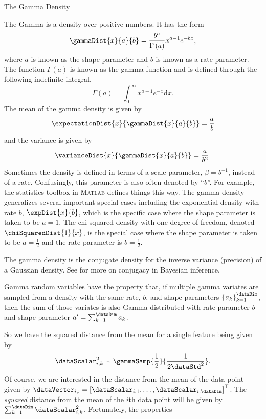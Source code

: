 \begin{boxfloat}
  \caption{The Gamma Density}\label{box:gamma}

  The Gamma is a density over positive numbers. It has the
  form
  \[ 
  \gammaDist{x}{a}{b}=\frac{b^{a}}{\Gamma\left(a\right)}x^{a-1}e^{-bx},
  \] 
  where $a$ is known as the shape parameter and $b$ is known as a rate
  parameter. The function $\Gamma\left(a\right)$ is known as the gamma
  function and is defined through the following indefinite integral,
  \[
  \Gamma\left(a\right)=\int_{0}^{\infty}x^{a-1}e^{-x}\text{d}x.
  \]
  The mean of the gamma density is given by
  \[ 
  \expectationDist{x}{\gammaDist{x}{a}{b}}=\frac{a}{b}
  \] 
  and the variance is given by
  \[
  \varianceDist{x}{\gammaDist{x}{a}{b}}=\frac{a}{b^{2}}.
  \] 
  Sometimes the density is defined in terms of a scale parameter,
  $\beta=b^{-1}$, instead of a rate. Confusingly, this parameter is
  also often denoted by ``$b$''. For example, the statistics toolbox
  in \textsc{Matlab} defines things this way. The gamma density
  generalizes several important special cases including the
  exponential density with rate $b$, $\expDist{x}{b}$, which is the
  specific case where the shape parameter is taken to be $a=1$. The
  chi-squared density with one degree of freedom, denoted
  $\chiSquaredDist{1}{x}$, is the special case where the shape
  parameter is taken to be $a=\frac{1}{2}$ and the rate parameter is
  $b=\frac{1}{2}$.

  The gamma density is the conjugate density for the inverse variance
  (precision) of a Gaussian density. See  for
  more on conjugacy in Bayesian inference.

  Gamma random variables have the property that, if multiple gamma
  variates are sampled from a density with the same rate, $b$, and
  shape parameters $\left\{a_k\right\}^\dataDim_{k=1}$, then the sum
  of those variates is also Gamma distributed with rate parameter $b$
  and shape parameter $a^\prime = \sum_{k=1}^\dataDim a_k$.
\end{boxfloat}
So we have the squared distance from the mean for a single feature being given
by
\[
\dataScalar_{i,k}^{2}\sim\gammaSamp{\frac{1}{2}}{\frac{1}{2\dataStd^{2}}}.
\]
Of course, we are interested in the distance from the mean of the data
point given by $\dataVector_{i,:}=\left[\dataScalar_{i,1}, \dots,
  \dataScalar_{i,\dataDim}\right]^\top$. The \emph{squared} distance
from the mean of the $i$th data point will be given by
$\sum_{k=1}^\dataDim \dataScalar_{i,k}^2$. Fortunately, the properties
